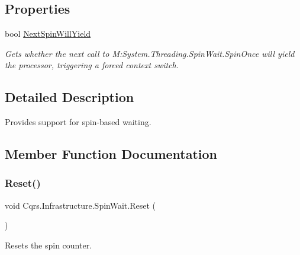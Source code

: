 \subsection*{Properties}
\begin{DoxyCompactItemize}
\item 
bool \hyperlink{structCqrs_1_1Infrastructure_1_1SpinWait_a8bf89d0140fcedc664f18b41229cda0a_a8bf89d0140fcedc664f18b41229cda0a}{Next\+Spin\+Will\+Yield}
\begin{DoxyCompactList}\small\item\em Gets whether the next call to M\+:\+System.\+Threading.\+Spin\+Wait.\+Spin\+Once will yield the processor, triggering a forced context switch. \end{DoxyCompactList}\end{DoxyCompactItemize}


\subsection{Detailed Description}
Provides support for spin-\/based waiting. 



\subsection{Member Function Documentation}
\mbox{\label{structCqrs_1_1Infrastructure_1_1SpinWait_a32a06438f849dc88a0fce77b23e3271e_a32a06438f849dc88a0fce77b23e3271e}} 
\subsubsection{\texorpdfstring{Reset()}{Reset()}}
{\footnotesize\ttfamily void Cqrs.\+Infrastructure.\+Spin\+Wait.\+Reset (\begin{DoxyParamCaption}{ }\end{DoxyParamCaption})}



Resets the spin counter. 

\mbox{\label{structCqrs_1_1Infrastructure_1_1SpinWait_a2df9b40d5281fda47702cc99fac7e6d3_a2df9b40d5281fda47702cc99fac7e6d3}} 

